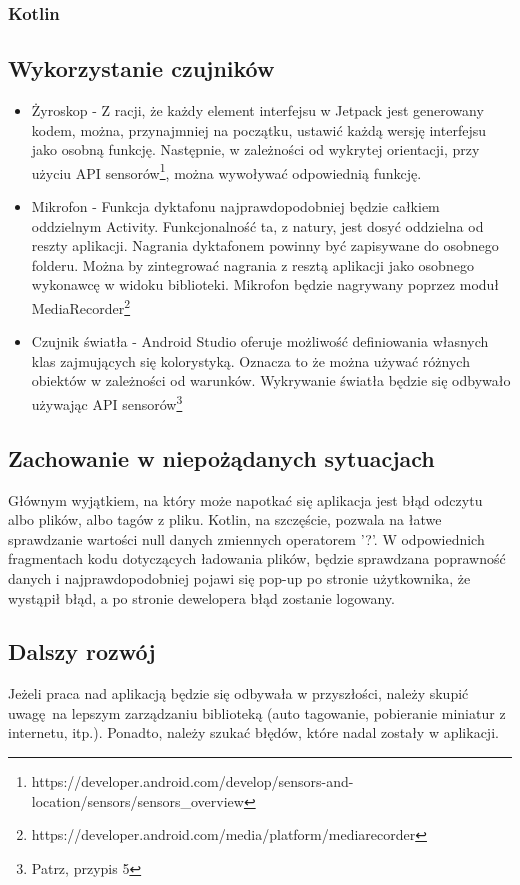 \subsubsection{Kotlin}

\subsection{Wykorzystanie czujników}

\begin{itemize}
	\item Żyroskop - Z racji, że każdy element interfejsu w Jetpack jest generowany kodem, można, przynajmniej na początku, ustawić każdą wersję interfejsu jako osobną funkcję. Następnie, w zależności od wykrytej orientacji, przy użyciu API sensorów\footnote{https://developer.android.com/develop/sensors-and-location/sensors/sensors\_overview}, można wywoływać odpowiednią funkcję.
	
	\item Mikrofon - Funkcja dyktafonu najprawdopodobniej będzie całkiem oddzielnym Activity. Funkcjonalność ta, z natury, jest dosyć oddzielna od reszty aplikacji. Nagrania dyktafonem powinny być zapisywane do osobnego folderu. Można by zintegrować nagrania z resztą aplikacji jako osobnego wykonawcę w widoku biblioteki. Mikrofon będzie nagrywany poprzez moduł MediaRecorder\footnote{https://developer.android.com/media/platform/mediarecorder}

	\item Czujnik światła - Android Studio oferuje możliwość definiowania własnych klas zajmujących się kolorystyką. Oznacza to że można używać różnych obiektów w zależności od warunków. Wykrywanie światła będzie się odbywało używając API sensorów\footnote{Patrz, przypis 5} %
\end{itemize}


\subsection{Zachowanie w niepożądanych sytuacjach}

Głównym wyjątkiem, na który może napotkać się aplikacja jest błąd odczytu albo plików, albo tagów z pliku. Kotlin, na szczęście, pozwala na łatwe sprawdzanie wartości null danych zmiennych operatorem '?'. W odpowiednich fragmentach kodu dotyczących ładowania plików, będzie sprawdzana poprawność danych i najprawdopodobniej pojawi się pop-up po stronie użytkownika, że wystąpił błąd, a po stronie dewelopera błąd zostanie logowany.

\subsection{Dalszy rozwój}

Jeżeli praca nad aplikacją będzie się odbywała w przyszłości, należy skupić uwagę na lepszym zarządzaniu biblioteką (auto tagowanie, pobieranie miniatur z internetu, itp.). Ponadto, należy szukać błędów, które nadal zostały w aplikacji.
